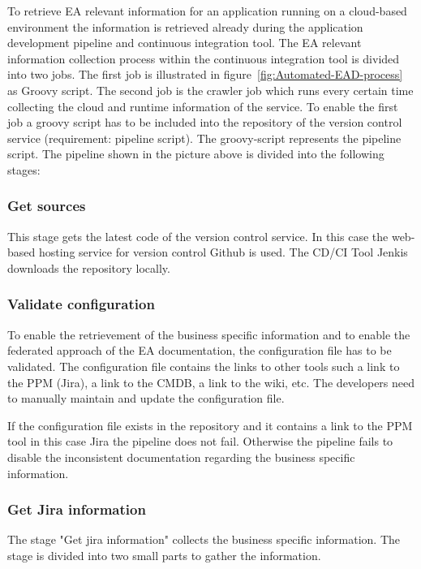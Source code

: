 To retrieve EA relevant information for an application running on a cloud-based environment the information is retrieved already during the application development pipeline and continuous integration tool. The EA relevant information collection process within the continuous integration tool is divided into two jobs. The first job is illustrated in figure~\ref{fig:Automated-EAD-process} as Groovy script. The second job is the crawler job which runs every certain time collecting the cloud and runtime information of the service. To enable the first job a groovy script has to be included into the repository of the version control service (requirement: pipeline script). The groovy-script represents the pipeline script. The pipeline shown in the picture above is divided into the following stages:

\subsubsection{Get sources}
This stage gets the latest code of the version control service. In this case the web-based hosting service for version control Github is used. The CD/CI Tool Jenkis downloads the repository locally. 

\subsubsection{Validate configuration}
To enable the retrievement of the business specific information and to enable the federated approach of the EA documentation, the configuration file has to be validated. The configuration file contains the links to other tools such a link to the PPM (Jira), a link to the CMDB, a link to the wiki, etc. The developers need to manually maintain and update the configuration file.

If the configuration file exists in the repository and it contains a link to the PPM tool in this case Jira the pipeline does not fail. Otherwise the pipeline fails to disable the inconsistent documentation regarding the business specific information.

\subsubsection{Get Jira information}\label{subsubsection:getjirainformation}
The stage "Get jira information" collects the business specific information. The stage is divided into two small parts to gather the information.


